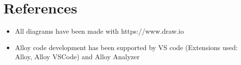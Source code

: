\chapter{References}
\begin{itemize}
    \item All diagrams have been made with https://www.draw.io
    \item Alloy code development has been supported by VS code (Extensions used: Alloy, Alloy VSCode) and Alloy Analyzer
\end{itemize}
